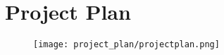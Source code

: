 \section{Project Plan}

\begin{frame}
  \begin{figure}
    \centering
    \texttt{[image: project\_plan/projectplan.png]}

    \label{fig:visualReq}
  \end{figure}
\end{frame}